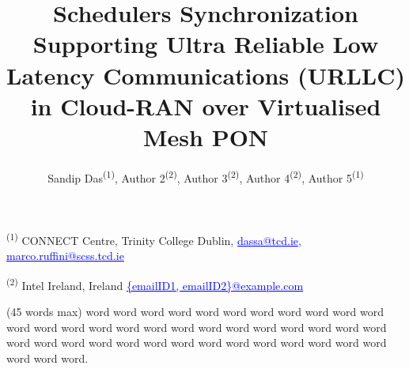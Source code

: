 \documentclass[a4paper, oneside, twocolumn, notitlepage, 10pt]{extarticle_ecoc}
\begin{document}


\title{Schedulers Synchronization Supporting Ultra Reliable Low Latency Communications (URLLC) in Cloud-RAN over Virtualised Mesh PON }%

\author{\vspace{-0.3in}
    Sandip Das\textsuperscript{(1)}, Author 2\textsuperscript{(2)},
    Author 3\textsuperscript{(2)}, Author 4\textsuperscript{(2)}, Author 5\textsuperscript{(1)}
}

\maketitle                  %


\begin{strip}
 \begin{author_descr}

   \textsuperscript{(1)} CONNECT Centre, Trinity College Dublin,
   \textcolor{blue}{\uline{dassa@tcd.ie}, \uline{marco.ruffini@scss.tcd.ie}}

   \textsuperscript{(2)} Intel Ireland, Ireland
   \textcolor{blue}{\uline{\{emailID1, emailID2\}@example.com}}
 \end{author_descr}
\vspace{-0.1in}
\end{strip}



\begin{strip}
  \begin{ecoc_abstract}
    (45 words max) word word word word word word word word word word word word word word word word word word word word word word word word word word word word word word word word word word word word word word word word word word.
  \end{ecoc_abstract}
\vspace*{-0.15in}
\end{strip}

\end{document}
